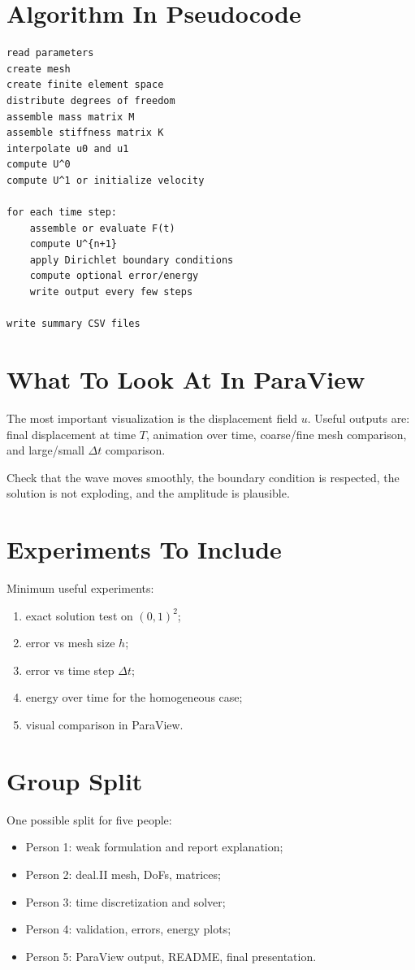 \documentclass[11pt,a4paper]{article}
\begin{document}
\section{Algorithm In Pseudocode}
\begin{verbatim}
read parameters
create mesh
create finite element space
distribute degrees of freedom
assemble mass matrix M
assemble stiffness matrix K
interpolate u0 and u1
compute U^0
compute U^1 or initialize velocity

for each time step:
    assemble or evaluate F(t)
    compute U^{n+1}
    apply Dirichlet boundary conditions
    compute optional error/energy
    write output every few steps

write summary CSV files
\end{verbatim}

\section{What To Look At In ParaView}
The most important visualization is the displacement field \(u\). Useful outputs are:
final displacement at time \(T\), animation over time, coarse/fine mesh comparison,
and large/small \(\Delta t\) comparison.

Check that the wave moves smoothly, the boundary condition is respected, the solution is not
exploding, and the amplitude is plausible.

\section{Experiments To Include}
Minimum useful experiments:
\begin{enumerate}
\item exact solution test on \((0,1)^2\);
\item error vs mesh size \(h\);
\item error vs time step \(\Delta t\);
\item energy over time for the homogeneous case;
\item visual comparison in ParaView.
\end{enumerate}

\section{Group Split}
One possible split for five people:
\begin{itemize}
\item Person 1: weak formulation and report explanation;
\item Person 2: deal.II mesh, DoFs, matrices;
\item Person 3: time discretization and solver;
\item Person 4: validation, errors, energy plots;
\item Person 5: ParaView output, README, final presentation.
\end{itemize}
\end{document}
